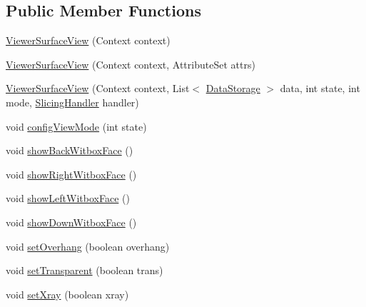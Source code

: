 \subsection*{Public Member Functions}
\begin{DoxyCompactItemize}
\item 
\hyperlink{classandroid_1_1app_1_1printerapp_1_1viewer_1_1_viewer_surface_view_a7c828aef5e1ac634909872da0cbbbc1f}{Viewer\+Surface\+View} (Context context)
\item 
\hyperlink{classandroid_1_1app_1_1printerapp_1_1viewer_1_1_viewer_surface_view_a4b3ef7c8fe9dac4f9e7c990f050dcf99}{Viewer\+Surface\+View} (Context context, Attribute\+Set attrs)
\item 
\hyperlink{classandroid_1_1app_1_1printerapp_1_1viewer_1_1_viewer_surface_view_a4d2ddf97aa7642c436cb51c22d2cc9fe}{Viewer\+Surface\+View} (Context context, List$<$ \hyperlink{classandroid_1_1app_1_1printerapp_1_1viewer_1_1_data_storage}{Data\+Storage} $>$ data, int state, int mode, \hyperlink{classandroid_1_1app_1_1printerapp_1_1viewer_1_1_slicing_handler}{Slicing\+Handler} handler)
\item 
void \hyperlink{classandroid_1_1app_1_1printerapp_1_1viewer_1_1_viewer_surface_view_a420e8771dfd8f074113afd0828720d7a}{config\+View\+Mode} (int state)
\item 
void \hyperlink{classandroid_1_1app_1_1printerapp_1_1viewer_1_1_viewer_surface_view_afcf9a5b057ae0e76ca39dd360cefdb87}{show\+Back\+Witbox\+Face} ()
\item 
void \hyperlink{classandroid_1_1app_1_1printerapp_1_1viewer_1_1_viewer_surface_view_a23f42c1372ac93775e4ae573518b2c67}{show\+Right\+Witbox\+Face} ()
\item 
void \hyperlink{classandroid_1_1app_1_1printerapp_1_1viewer_1_1_viewer_surface_view_a3796b712dda8f75f6c2a55eda3693f8c}{show\+Left\+Witbox\+Face} ()
\item 
void \hyperlink{classandroid_1_1app_1_1printerapp_1_1viewer_1_1_viewer_surface_view_a00930c092ca9f884ce3571d255451bfd}{show\+Down\+Witbox\+Face} ()
\item 
void \hyperlink{classandroid_1_1app_1_1printerapp_1_1viewer_1_1_viewer_surface_view_aa02aa6afc4bc5ce03aebfc6d1620b2a5}{set\+Overhang} (boolean overhang)
\item 
void \hyperlink{classandroid_1_1app_1_1printerapp_1_1viewer_1_1_viewer_surface_view_a3dab20e4ac38cf5a77ee6be3a32a5332}{set\+Transparent} (boolean trans)
\item 
void \hyperlink{classandroid_1_1app_1_1printerapp_1_1viewer_1_1_viewer_surface_view_a11a1cf53655ff131940aa9ed3bde4ca0}{set\+Xray} (boolean xray)

\end{DoxyCompactItemize}
